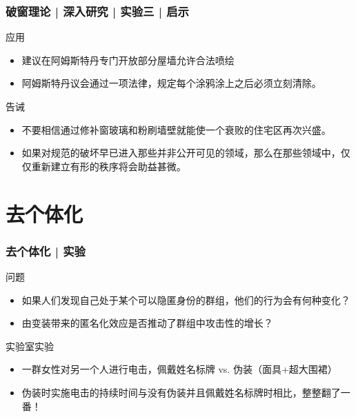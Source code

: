 \begin{frame}
  \frametitle{破窗理论 | 深入研究 | 实验三 | 启示}
  \begin{block}{应用}
    \begin{itemize}
      \item 建议在阿姆斯特丹专门开放部分屋墙允许合法喷绘
      \item 阿姆斯特丹议会通过一项法律，规定每个涂鸦涂上之后必须立刻清除。
    \end{itemize}
  \end{block}
  \pause
  \begin{block}{告诫}
    \begin{itemize}
       \item  不要相信通过修补窗玻璃和粉刷墙壁就能使一个衰败的住宅区再次兴盛。
       \item 如果对规范的破坏早已进入那些并非公开可见的领域，那么在那些领域中，仅仅重新建立有形的秩序将会助益甚微。
    \end{itemize}
  \end{block}
\end{frame}

\section{去个体化}
\begin{frame}
  \frametitle{去个体化 | 实验}
  \begin{block}{问题}
    \begin{itemize}
      \item 如果人们发现自己处于某个可以隐匿身份的群组，他们的行为会有何种变化？
      \item 由变装带来的匿名化效应是否推动了群组中攻击性的增长？
    \end{itemize}
  \end{block}
  \pause
  \begin{block}{实验室实验}
    \begin{itemize}
      \item 一群女性对另一个人进行电击，佩戴姓名标牌 vs. 伪装（面具+超大围裙）
      \item 伪装时实施电击的持续时间与没有伪装并且佩戴姓名标牌时相比，整整翻了一番！
    \end{itemize}
  \end{block}
\end{frame}

